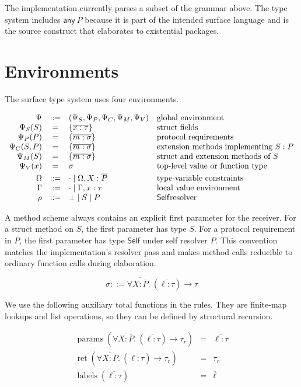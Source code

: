 \documentclass[manuscript]{acmart}
\newcommand{\kw}[1]{\ensuremath{\mathsf{#1}}}
\newcommand{\Self}{\kw{Self}}
\newcommand{\Any}[1]{\kw{any}\ #1}
\newcommand{\params}{\operatorname{params}}
\newcommand{\ret}{\operatorname{ret}}
\newcommand{\labels}{\operatorname{labels}}
\newcommand{\ftype}[3]{\forall #1.\ (#2) \to #3}
\newcommand{\emptyctx}{\cdot}
\begin{document}
The implementation currently parses a subset of the grammar above.
The type system includes $\Any{P}$ because it is part of the intended surface language and is the source construct that elaborates to existential packages.

\section{Environments}

The surface type system uses four environments.

\[
\begin{array}{rcll}
\Psi & ::= &
  \left(
    \Psi_S,\Psi_P,\Psi_C,\Psi_M,\Psi_V
  \right)
  & \text{global environment} \\
\Psi_S(S) &=& \{\overline{x : \tau}\}
  & \text{struct fields} \\
\Psi_P(P) &=& \{\overline{m : \sigma}\}
  & \text{protocol requirements} \\
\Psi_C(S,P) &=& \{\overline{m : \sigma}\}
  & \text{extension methods implementing } S:P \\
\Psi_M(S) &=& \{\overline{m : \sigma}\}
  & \text{struct and extension methods of } S \\
\Psi_V(x) &=& \sigma
  & \text{top-level value or function type} \\[1mm]
\Omega & ::= & \emptyctx \mid \Omega, X : \overline{P}
  & \text{type-variable constraints} \\
\Gamma & ::= & \emptyctx \mid \Gamma, x : \tau
  & \text{local value environment} \\
\rho & ::= & \bot \mid S \mid P
  & \text{\Self resolver}
\end{array}
\]

A method scheme always contains an explicit first parameter for the receiver.
For a struct method on $S$, the first parameter has type $S$.
For a protocol requirement in $P$, the first parameter has type $\Self$ under self resolver $P$.
This convention matches the implementation's resolver pass and makes method calls reducible to ordinary function calls during elaboration.

\[
\sigma ::= \ftype{\overline{X : \overline{P}}}{\overline{\ell : \tau}}{\tau}
\]

We use the following auxiliary total functions in the rules.
They are finite-map lookups and list operations, so they can be defined by structural recursion.

\[
\begin{array}{rcl}
\params(\ftype{\overline{X : \overline{P}}}{\overline{\ell : \tau}}{\tau_r})
  &=& \overline{\ell : \tau} \\
\ret(\ftype{\overline{X : \overline{P}}}{\overline{\ell : \tau}}{\tau_r})
  &=& \tau_r \\
\labels(\overline{\ell : \tau}) &=& \overline{\ell}
\end{array}
\]
\end{document}
